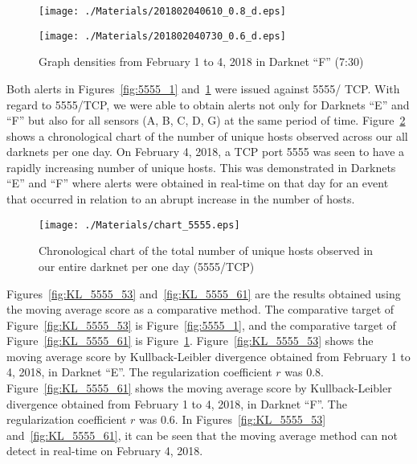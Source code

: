 \documentclass[letterpaper]{sig-alternate-10pt}
\begin{document}
\begin{figure}[htb]
\begin{center}
	\texttt{[image: ./Materials/201802040610\_0.8\_d.eps]}
	\caption{Graph densities from February 1 to 4, 2018 in Darknet ``E'' (6:10)}
  	\label{fig:5555_1}
	\vspace*{0.5cm}
	\texttt{[image: ./Materials/201802040730\_0.6\_d.eps]}
	\caption{Graph densities from February 1 to 4, 2018 in Darknet ``F'' (7:30)}
  	\label{fig:5555_2}
\end{center}
\end{figure}

Both alerts in Figures~\ref{fig:5555_1} and~\ref{fig:5555_2} were issued against 5555/ TCP.
With regard to 5555/TCP, we were able to obtain alerts not only for Darknets ``E'' and ``F'' but also for all sensors (A, B, C, D, G) at the same period of time.
Figure~\ref{fig:chart_5555} shows a chronological chart of the number of unique hosts observed across our all darknets per one day.
On February 4, 2018, a TCP port 5555 was seen to have a rapidly increasing number of unique hosts.
This was demonstrated in Darknets ``E'' and ``F'' where alerts were obtained in real-time on that day for an event that occurred in relation to an abrupt increase in the number of hosts.

\begin{figure}[htb]
\begin{center}
	\texttt{[image: ./Materials/chart\_5555.eps]}
	\caption{Chronological chart of the total number of unique hosts observed in our entire darknet per one day (5555/TCP)}
  	\label{fig:chart_5555}
\end{center}
\end{figure}

Figures~\ref{fig:KL_5555_53} and~\ref{fig:KL_5555_61} are the results obtained using the moving average score as a comparative method.
The comparative target of Figure~\ref{fig:KL_5555_53} is Figure~\ref{fig:5555_1}, and the comparative target of Figure~\ref{fig:KL_5555_61} is Figure~\ref{fig:5555_2}.
Figure~\ref{fig:KL_5555_53} shows the moving average score by Kullback-Leibler divergence obtained from February 1 to 4, 2018, in Darknet ``E''.
The regularization coefficient $r$ was 0.8.
Figure~\ref{fig:KL_5555_61} shows the moving average score by Kullback-Leibler divergence obtained from February 1 to 4, 2018, in Darknet ``F''.
The regularization coefficient $r$ was 0.6.
In Figures~\ref{fig:KL_5555_53} and~\ref{fig:KL_5555_61}, it can be seen that the moving average method can not detect in real-time on February 4, 2018.
\end{document}
